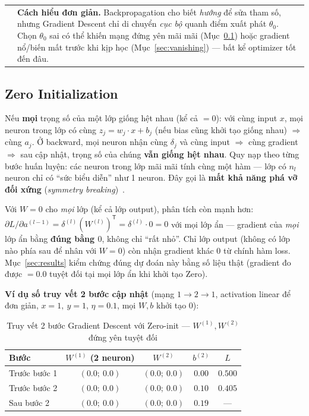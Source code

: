 \documentclass[12pt,a4paper]{article}
\makeatletter
\newenvironment{tructiep}[1][Cách hiểu đơn giản]
  {\par\smallskip\noindent\begin{tabular}{@{}p{0.35em}@{\hspace{6pt}}p{\dimexpr\linewidth-1.9em\relax}@{}}
   \textcolor{boxln}{\rule{2pt}{\baselineskip}} & \textbf{#1.}\enspace\ignorespaces}
  {\end{tabular}\par\smallskip}
\newcommand{\en}[1]{\textit{#1}}
\newcommand{\T}{^{\mathsf{T}}}
\makeatother
\begin{document}
\begin{tructiep}
Backpropagation cho biết \emph{hướng} để sửa tham số, nhưng Gradient
Descent chỉ di chuyển \emph{cục bộ} quanh điểm xuất phát $\theta_0$. Chọn
$\theta_0$ sai có thể khiến mạng đứng yên mãi mãi (Mục~\ref{sec:zero}) hoặc
gradient nổ/biến mất trước khi kịp học (Mục~\ref{sec:vanishing}) --- bất
kể optimizer tốt đến đâu.
\end{tructiep}

\subsection{Zero Initialization}
\label{sec:zero}

Nếu \textbf{mọi} trọng số của một lớp giống hệt nhau (kể cả $=0$): với
cùng input $x$, mọi neuron trong lớp có cùng $z_j=w_j\cdot x+b_j$ (nếu bias
cũng khởi tạo giống nhau) $\Rightarrow$ cùng $a_j$. Ở backward, mọi neuron
nhận cùng $\delta_j$ và cùng input $\Rightarrow$ cùng gradient
$\Rightarrow$ sau cập nhật, trọng số của chúng \textbf{vẫn giống hệt
nhau}. Quy nạp theo từng bước huấn luyện: các neuron trong lớp mãi mãi
tính cùng một hàm --- lớp có $n_l$ neuron chỉ có ``sức biểu diễn'' như 1
neuron. Đây gọi là \textbf{mất khả năng phá vỡ đối xứng} (\en{symmetry
breaking})~\citep{goodfellow2016deep}.

Với $W=0$ cho \emph{mọi} lớp (kể cả lớp output), phân tích còn mạnh hơn:
$\partial L/\partial a^{(l-1)} = \delta^{(l)}(W^{(l)})\T = \delta^{(l)}\cdot
0 = 0$ với mọi lớp ẩn --- gradient của \emph{mọi} lớp ẩn bằng \textbf{đúng
bằng $0$}, không chỉ ``rất nhỏ''. Chỉ lớp output (không có lớp nào phía sau
để nhân với $W=0$) còn nhận gradient khác 0 từ chính hàm loss. Mục~\ref{sec:results}
kiểm chứng đúng dự đoán này bằng số liệu thật (gradient đo được $=0.0$
tuyệt đối tại mọi lớp ẩn khi khởi tạo Zero).

\textbf{Ví dụ số truy vết 2 bước cập nhật} (mạng $1\to2\to1$, activation
linear để đơn giản, $x=1,\ y=1$, $\eta=0.1$, mọi $W,b$ khởi tạo $0$):

\begin{table}[H]
\centering
\caption{Truy vết 2 bước Gradient Descent với Zero-init --- $W^{(1)},W^{(2)}$ đứng yên tuyệt đối}
\small
\begin{tabular}{@{}lcccc@{}}
\toprule
Bước & $W^{(1)}$ (2 neuron) & $W^{(2)}$ & $b^{(2)}$ & $L$ \\
\midrule
Trước bước 1 & $(0.0;\ 0.0)$ & $(0.0;\ 0.0)$ & $0.00$ & $0.500$ \\
Trước bước 2 & $(0.0;\ 0.0)$ & $(0.0;\ 0.0)$ & $0.10$ & $0.405$ \\
Sau bước 2 & $(0.0;\ 0.0)$ & $(0.0;\ 0.0)$ & $0.19$ & --- \\
\bottomrule
\end{tabular}
\label{tab:zerotrace}
\end{table}
\end{document}
